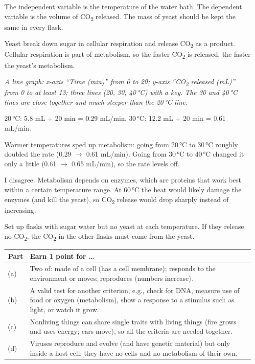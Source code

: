 \documentclass[11pt,letterpaper]{article}
\begin{document}
\modelanswer
\begin{parts}
  \item The independent variable is the temperature of the water bath. The dependent variable is the volume of CO\textsubscript{2} released. The mass of yeast should be kept the same in every flask.
  \item Yeast break down sugar in cellular respiration and release CO\textsubscript{2} as a product. Cellular respiration is part of metabolism, so the faster CO\textsubscript{2} is released, the faster the yeast's metabolism.
  \item \emph{A line graph: x-axis ``Time (min)'' from 0 to 20; y-axis ``CO\textsubscript{2} released (mL)'' from 0 to at least 13; three lines (20, 30, 40\,°C) with a key. The 30 and 40\,°C lines are close together and much steeper than the 20\,°C line.}
  \item 20\,°C: 5.8 mL ÷ 20 min = 0.29 mL/min. 30\,°C: 12.2 mL ÷ 20 min = 0.61 mL/min.
  \item Warmer temperatures sped up metabolism: going from 20\,°C to 30\,°C roughly doubled the rate (0.29 $\rightarrow$ 0.61 mL/min). Going from 30\,°C to 40\,°C changed it only a little (0.61 $\rightarrow$ 0.65 mL/min), so the rate levels off.
  \item I disagree. Metabolism depends on enzymes, which are proteins that work best within a certain temperature range. At 60\,°C the heat would likely damage the enzymes (and kill the yeast), so CO\textsubscript{2} release would drop sharply instead of increasing.
  \item Set up flasks with sugar water but no yeast at each temperature. If they release no CO\textsubscript{2}, the CO\textsubscript{2} in the other flasks must come from the yeast.
\end{parts}


\begin{center}
\begin{tabularx}{\linewidth}{@{}lY@{}}
\toprule
Part & Earn 1 point for \dots{} \\
\midrule
(a) & Two of: made of a cell (has a cell membrane); responds to the environment or moves; reproduces (numbers increase). \\
(b) & A valid test for another criterion, e.g., check for DNA, measure use of food or oxygen (metabolism), show a response to a stimulus such as light, or watch it grow. \\
(c) & Nonliving things can share single traits with living things (fire grows and uses energy; cars move), so all the criteria are needed together. \\
(d) & Viruses reproduce and evolve (and have genetic material) but only inside a host cell; they have no cells and no metabolism of their own. \\
\bottomrule
\end{tabularx}
\end{center}
\end{document}
